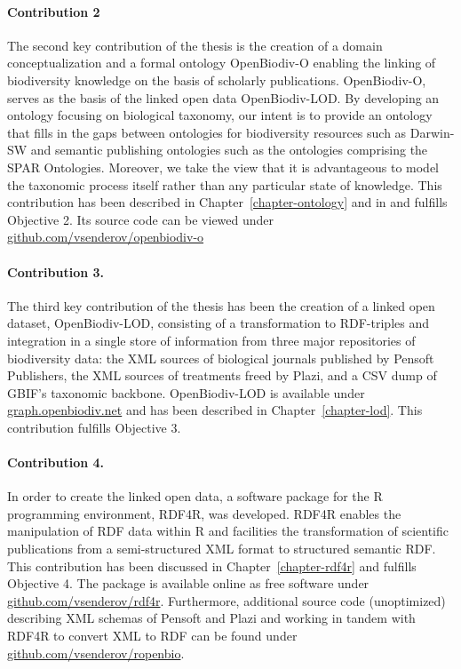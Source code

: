 \paragraph{Contribution 2} The second key contribution of the thesis is the creation of a domain conceptualization and a formal ontology OpenBiodiv-O enabling the linking of biodiversity knowledge on the basis of scholarly publications. OpenBiodiv-O, serves as the basis of the linked open data OpenBiodiv-LOD. By developing an ontology focusing on biological taxonomy, our intent is to provide an ontology that fills in the gaps between ontologies for biodiversity resources such as Darwin-SW and semantic publishing ontologies such as the ontologies comprising the SPAR Ontologies. Moreover, we take the view that it is advantageous to model the taxonomic process itself rather than any particular state of knowledge. This contribution has been described in Chapter~\ref{chapter-ontology} and in \cite{senderov_openbiodiv-o:_2018} and fulfills Objective 2. Its source code can be viewed under \href{https://github.com/vsenderov/openbiodiv-o}{github.com/vsenderov/openbiodiv-o}

\paragraph{Contribution 3.} The third key contribution of the thesis has been the creation of a linked open dataset, OpenBiodiv-LOD, consisting of a transformation to RDF-triples and integration in a single store of information from three major repositories of biodiversity data: the XML sources of biological journals published by Pensoft Publishers, the XML sources of treatments freed by Plazi, and a CSV dump of GBIF's taxonomic backbone. OpenBiodiv-LOD is available under \href{http://graph.openbiodiv.net}{\url{graph.openbiodiv.net}} and has been described in Chapter~\ref{chapter-lod}. This contribution fulfills Objective 3.

\paragraph{Contribution 4.} In order to  create the linked open data, a software package for the R programming environment, RDF4R, was developed. RDF4R enables the manipulation of RDF data within R and facilities the transformation of scientific publications from a semi-structured XML format to structured semantic RDF. This contribution has been discussed in Chapter~\ref{chapter-rdf4r} and fulfills Objective 4. The package is available online as free software under \href{http://github.com/vsenderov/rdf4r}{\url{github.com/vsenderov/rdf4r}}. Furthermore, additional source code (unoptimized) describing XML schemas of Pensoft and Plazi and working in tandem with RDF4R to convert XML to RDF can be found under \href{http://github.com/vsenderov/ropenbio}{\url{github.com/vsenderov/ropenbio}}.

